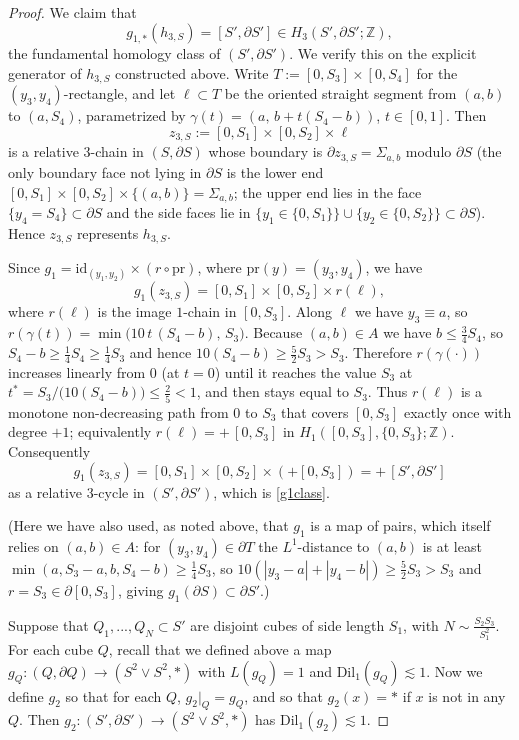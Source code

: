 \documentclass{amsart}
\newtheorem*{theorem 1}{Theorem 1}
\newtheorem*{theorem 2}{Theorem 2}
\newtheorem*{theorem 3}{Theorem 3}
\numberwithin{equation}{section}
\newcommand{\Dil}{\textrm{Dil}}
\newcommand{\ZZ}{\mathbb{Z}}
\begin{document}
\begin{proof}
We claim that
\begin{equation} \label{g1class}
g_{1,*}(h_{3,S}) = [S',\partial S'] \in H_3(S',\partial S';\ZZ),
\end{equation}
the fundamental homology class of $(S',\partial S')$.  We verify this on the explicit generator of $h_{3,S}$ constructed above.  Write $T := [0,S_3]\times[0,S_4]$ for the $(y_3,y_4)$-rectangle, and let $\ell \subset T$ be the oriented straight segment from $(a,b)$ to $(a,S_4)$, parametrized by $\gamma(t) = (a,\,b+t(S_4-b))$, $t\in[0,1]$.  Then
$$ z_{3,S} := [0,S_1]\times[0,S_2]\times \ell $$
is a relative $3$-chain in $(S,\partial S)$ whose boundary is $\partial z_{3,S} = \Sigma_{a,b}$ modulo $\partial S$ (the only boundary face not lying in $\partial S$ is the lower end $[0,S_1]\times[0,S_2]\times\{(a,b)\} = \Sigma_{a,b}$; the upper end lies in the face $\{y_4 = S_4\}\subset\partial S$ and the side faces lie in $\{y_1\in\{0,S_1\}\}\cup\{y_2\in\{0,S_2\}\}\subset\partial S$).  Hence $z_{3,S}$ represents $h_{3,S}$.

Since $g_1 = \mathrm{id}_{(y_1,y_2)}\times(r\circ\mathrm{pr})$, where $\mathrm{pr}(y)=(y_3,y_4)$, we have
$$ g_1(z_{3,S}) = [0,S_1]\times[0,S_2]\times r(\ell), $$
where $r(\ell)$ is the image $1$-chain in $[0,S_3]$.  Along $\ell$ we have $y_3\equiv a$, so $r(\gamma(t)) = \min\big(10\,t\,(S_4-b),\,S_3\big)$.  Because $(a,b)\in A$ we have $b\le \tfrac34 S_4$, so $S_4-b\ge \tfrac14 S_4 \ge \tfrac14 S_3$ and hence $10(S_4-b)\ge \tfrac{5}{2}S_3 > S_3$.  Therefore $r(\gamma(\cdot))$ increases linearly from $0$ (at $t=0$) until it reaches the value $S_3$ at $t^\ast = S_3/\big(10(S_4-b)\big)\le \tfrac25 < 1$, and then stays equal to $S_3$.  Thus $r(\ell)$ is a monotone non-decreasing path from $0$ to $S_3$ that covers $[0,S_3]$ exactly once with degree $+1$; equivalently $r(\ell) = +\,[0,S_3]$ in $H_1([0,S_3],\{0,S_3\};\ZZ)$.  Consequently
$$ g_1(z_{3,S}) = [0,S_1]\times[0,S_2]\times(+[0,S_3]) = +\,[S',\partial S'] $$
as a relative $3$-cycle in $(S',\partial S')$, which is \eqref{g1class}.

(Here we have also used, as noted above, that $g_1$ is a map of pairs, which itself relies on $(a,b)\in A$: for $(y_3,y_4)\in\partial T$ the $L^1$-distance to $(a,b)$ is at least $\min(a,S_3-a,b,S_4-b)\ge \tfrac14 S_3$, so $10(|y_3-a|+|y_4-b|)\ge \tfrac52 S_3 > S_3$ and $r=S_3\in\partial[0,S_3]$, giving $g_1(\partial S)\subset\partial S'$.)


Suppose that $Q_1,  ...,  Q_N \subset S'$ are disjoint cubes of side length $S_1$,  with $N \sim  \frac{S_2 S_3}{S_1^2}$.   For each cube $Q$,  recall that we defined above a map
$g_Q: (Q, \partial Q) \rightarrow (S^2 \vee S^2, *)$ with $L(g_Q) = 1$ and $\Dil_1(g_Q) \lesssim 1$.   Now we define $g_2$ so that for each $Q$,  $g_2 |_Q = g_Q$,  and so that $g_2(x) = *$ if $x$ is not in any $Q$.   Then $g_2: (S', \partial S') \rightarrow (S^2 \vee S^2, *)$ has $\Dil_1(g_2) \lesssim 1$.


\end{proof}
\end{document}
